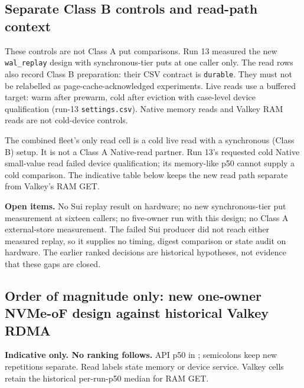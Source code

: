 \subsection{Separate Class B controls and read-path context}\label{sec:contract-b-controls}
These controls are not Class A put comparisons. Run 13 measured the new
\texttt{wal\_replay} design with synchronous-tier puts at one caller only.
The read rows also record Class B preparation: their CSV contract is
\texttt{durable}. They must not be relabelled as page-cache-acknowledged
experiments. Live reads use a buffered target: warm after prewarm, cold
after eviction with case-level device qualification (run-13 \texttt{settings.csv}). Native
memory reads and Valkey RAM reads are not cold-device controls.

\begin{table}[H]\centering{}
\caption{Separate Class B settings: synced-before-acknowledgement puts;
read rows name the write/preparation setting, not a read durability guarantee.
Run 13 only, one owner, one repetition per row, coordinator cache off.
The leased put uses lease-ahead; owner RPC is a different route. Polled warm
read is a separate arm. API quantiles are \us, not device-service times.
Sources: run-13 \texttt{puts.csv} and \texttt{reads.csv}; no subtraction or
cross-class ranking.}
\end{table}

The combined fleet's only read cell is a cold live read with a synchronous
(Class B) setup. It is not a Class A Native-read partner. Run 13's requested
cold Native small-value read failed device qualification; its memory-like
p50 cannot supply a cold comparison. The indicative table below keeps the
new read path separate from Valkey's RAM GET.

\textbf{Open items.} No Sui replay result on hardware; no new synchronous-tier
put measurement at sixteen callers; no five-owner run with this design;
no Class A external-store measurement. The failed Sui producer did not
reach either measured replay, so it supplies no timing, digest comparison
or state audit on hardware. The earlier ranked decisions are historical
hypotheses, not evidence that these gaps are closed.

\subsection{Order of magnitude only: new one-owner NVMe-oF design against historical Valkey RDMA}\label{sec:indicative}
\textbf{Indicative only. No ranking follows.} API p50 in \us; semicolons keep
new repetitions separate. Read labels state memory or device service.
Valkey cells retain the historical per-run-p50 median for RAM GET.

